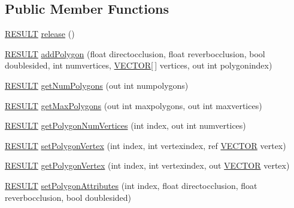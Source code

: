 \subsection*{Public Member Functions}
\begin{DoxyCompactItemize}
\item 
\hyperlink{namespace_f_m_o_d_a305d1176ef3f8c8815861a60407ac33d}{R\+E\+S\+U\+LT} \hyperlink{class_f_m_o_d_1_1_geometry_a55059fcb7fce590d4135cb84404d7cbb}{release} ()
\item 
\hyperlink{namespace_f_m_o_d_a305d1176ef3f8c8815861a60407ac33d}{R\+E\+S\+U\+LT} \hyperlink{class_f_m_o_d_1_1_geometry_ae46964f58a37da3881e74857cfedce73}{add\+Polygon} (float directocclusion, float reverbocclusion, bool doublesided, int numvertices, \hyperlink{struct_f_m_o_d_1_1_v_e_c_t_o_r}{V\+E\+C\+T\+OR}\mbox{[}$\,$\mbox{]} vertices, out int polygonindex)
\item 
\hyperlink{namespace_f_m_o_d_a305d1176ef3f8c8815861a60407ac33d}{R\+E\+S\+U\+LT} \hyperlink{class_f_m_o_d_1_1_geometry_a71e2d84a9cd5e4fff67cf8a25b92c471}{get\+Num\+Polygons} (out int numpolygons)
\item 
\hyperlink{namespace_f_m_o_d_a305d1176ef3f8c8815861a60407ac33d}{R\+E\+S\+U\+LT} \hyperlink{class_f_m_o_d_1_1_geometry_a19177e49f9de1cd6d5c0ae50ae147da8}{get\+Max\+Polygons} (out int maxpolygons, out int maxvertices)
\item 
\hyperlink{namespace_f_m_o_d_a305d1176ef3f8c8815861a60407ac33d}{R\+E\+S\+U\+LT} \hyperlink{class_f_m_o_d_1_1_geometry_afd25eca4187834a8b3466345852ce2d2}{get\+Polygon\+Num\+Vertices} (int index, out int numvertices)
\item 
\hyperlink{namespace_f_m_o_d_a305d1176ef3f8c8815861a60407ac33d}{R\+E\+S\+U\+LT} \hyperlink{class_f_m_o_d_1_1_geometry_aaaafc144eb110ffd6f0c251d54057782}{set\+Polygon\+Vertex} (int index, int vertexindex, ref \hyperlink{struct_f_m_o_d_1_1_v_e_c_t_o_r}{V\+E\+C\+T\+OR} vertex)
\item 
\hyperlink{namespace_f_m_o_d_a305d1176ef3f8c8815861a60407ac33d}{R\+E\+S\+U\+LT} \hyperlink{class_f_m_o_d_1_1_geometry_a9cf35f206581bd84eb6d1c04d499cbf7}{get\+Polygon\+Vertex} (int index, int vertexindex, out \hyperlink{struct_f_m_o_d_1_1_v_e_c_t_o_r}{V\+E\+C\+T\+OR} vertex)
\item 
\hyperlink{namespace_f_m_o_d_a305d1176ef3f8c8815861a60407ac33d}{R\+E\+S\+U\+LT} \hyperlink{class_f_m_o_d_1_1_geometry_a3dea6ebfee0b6c91237b7136c3cf0b78}{set\+Polygon\+Attributes} (int index, float directocclusion, float reverbocclusion, bool doublesided)
\item 

\end{DoxyCompactItemize}
